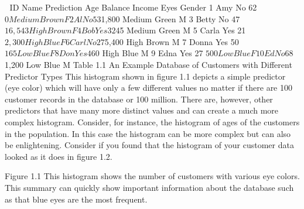 
ID
Name
Prediction
Age
Balance
Income
Eyes
Gender
1
Amy
No
62
$0
Medium
Brown
F
2
Al
No
53
$1,800
Medium
Green
M
3
Betty
No
47
$16,543
High
Brown
F
4
Bob
Yes
32
$45
Medium
Green
M
5
Carla
Yes
21
$2,300
High
Blue
F
6
Carl
No
27
$5,400
High
Brown
M
7
Donna
Yes
50
$165
Low
Blue
F
8
Don
Yes
46
$0
High
Blue
M
9
Edna
Yes
27
$500
Low
Blue
F
10
Ed
No
68
$1,200
Low
Blue
M
Table 1.1 An Example Database of Customers with Different Predictor Types
This histogram shown in figure 1.1 depicts a simple predictor (eye color) which will have only a few different values no matter if there are 100 customer records in the database or 100 million.  There are, however, other predictors that have many more distinct values and can create a much more complex histogram.  Consider, for instance, the histogram of ages of the customers in the population.  In this case the histogram can be more complex but can also be enlightening.  Consider if you found that the histogram of your customer data looked as it does in figure 1.2.

Figure 1.1 This histogram shows the number of customers with various eye colors.  This summary can quickly show important information about the database such as that blue eyes are the most frequent.

